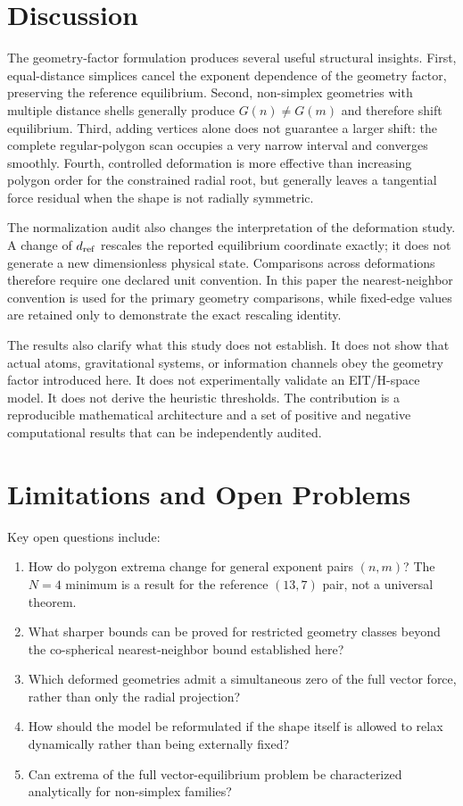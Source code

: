 \documentclass[11pt]{article}
\begin{document}
\section{Discussion}
The geometry-factor formulation produces several useful structural insights. First, equal-distance simplices cancel the exponent dependence of the geometry factor, preserving the reference equilibrium. Second, non-simplex geometries with multiple distance shells generally produce $G(n)\ne G(m)$ and therefore shift equilibrium. Third, adding vertices alone does not guarantee a larger shift: the complete regular-polygon scan occupies a very narrow interval and converges smoothly. Fourth, controlled deformation is more effective than increasing polygon order for the constrained radial root, but generally leaves a tangential force residual when the shape is not radially symmetric.

The normalization audit also changes the interpretation of the deformation study. A change of $d_{\rm ref}$ rescales the reported equilibrium coordinate exactly; it does not generate a new dimensionless physical state. Comparisons across deformations therefore require one declared unit convention. In this paper the nearest-neighbor convention is used for the primary geometry comparisons, while fixed-edge values are retained only to demonstrate the exact rescaling identity.

The results also clarify what this study does not establish. It does not show that actual atoms, gravitational systems, or information channels obey the geometry factor introduced here. It does not experimentally validate an EIT/H-space model. It does not derive the heuristic thresholds. The contribution is a reproducible mathematical architecture and a set of positive and negative computational results that can be independently audited.

\section{Limitations and Open Problems}
Key open questions include:
\begin{enumerate}
\item How do polygon extrema change for general exponent pairs $(n,m)$? The $N=4$ minimum is a result for the reference $(13,7)$ pair, not a universal theorem.
\item What sharper bounds can be proved for restricted geometry classes beyond the co-spherical nearest-neighbor bound established here?
\item Which deformed geometries admit a simultaneous zero of the full vector force, rather than only the radial projection?
\item How should the model be reformulated if the shape itself is allowed to relax dynamically rather than being externally fixed?
\item Can extrema of the full vector-equilibrium problem be characterized analytically for non-simplex families?
\end{enumerate}
\end{document}
